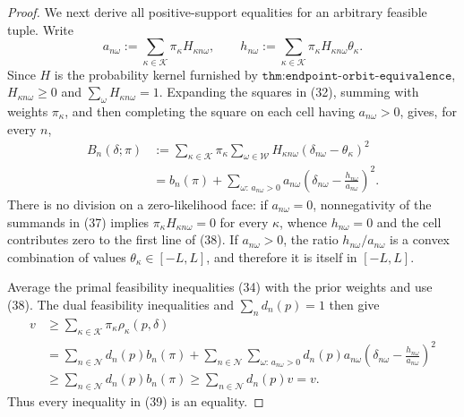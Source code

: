 \documentclass{article}
\begin{document}
\begin{proof}
We next derive all positive-support equalities for an arbitrary feasible tuple.  Write
\[
 a_{n\omega}:=\sum_{\kappa\in\mathcal K}
                  \pi_\kappa H_{\kappa n\omega},
 \qquad
 h_{n\omega}:=\sum_{\kappa\in\mathcal K}
                  \pi_\kappa H_{\kappa n\omega}\theta_\kappa.           \tag{37}
\]
Since \(H\) is the probability kernel furnished by \(\texttt{thm:endpoint-orbit-equivalence}\), \(H_{\kappa n\omega}\ge0\) and \(\sum_\omega H_{\kappa n\omega}=1\).  Expanding the squares in (32), summing with weights \(\pi_\kappa\), and then completing the square on each cell having \(a_{n\omega}>0\), gives, for every \(n\),
\[
\begin{aligned}
 B_n(\delta;\pi)
 &:=\sum_{\kappa\in\mathcal K}\pi_\kappa
       \sum_{\omega\in\mathcal W}H_{\kappa n\omega}
       (\delta_{n\omega}-\theta_\kappa)^2 \\
 &= b_n(\pi)
   +\sum_{\omega:\,a_{n\omega}>0}a_{n\omega}
      \left(\delta_{n\omega}-\frac{h_{n\omega}}{a_{n\omega}}\right)^2.
\end{aligned}                                                               \tag{38}
\]
There is no division on a zero-likelihood face: if \(a_{n\omega}=0\), nonnegativity of the summands in (37) implies
\(\pi_\kappa H_{\kappa n\omega}=0\) for every \(\kappa\), whence \(h_{n\omega}=0\) and the cell contributes zero to the first line of (38).  If \(a_{n\omega}>0\), the ratio \(h_{n\omega}/a_{n\omega}\) is a convex combination of values \(\theta_\kappa\in[-L,L]\), and therefore it is itself in \([-L,L]\).

Average the primal feasibility inequalities (34) with the prior weights and use (38).  The dual feasibility inequalities and \(\sum_n d_n(p)=1\) then give
\[
\begin{aligned}
 v
 &\ge \sum_{\kappa\in\mathcal K}\pi_\kappa
          \rho_\kappa(p,\delta) \\
 &=\sum_{n\in\mathcal N}d_n(p)b_n(\pi)
   +\sum_{n\in\mathcal N}\sum_{\omega:\,a_{n\omega}>0}
       d_n(p)a_{n\omega}
       \left(\delta_{n\omega}-\frac{h_{n\omega}}{a_{n\omega}}\right)^2 \\
 &\ge\sum_{n\in\mathcal N}d_n(p)b_n(\pi)
 \ge\sum_{n\in\mathcal N}d_n(p)v=v.
\end{aligned}                                                               \tag{39}
\]
Thus every inequality in (39) is an equality.


\end{proof}
\end{document}
